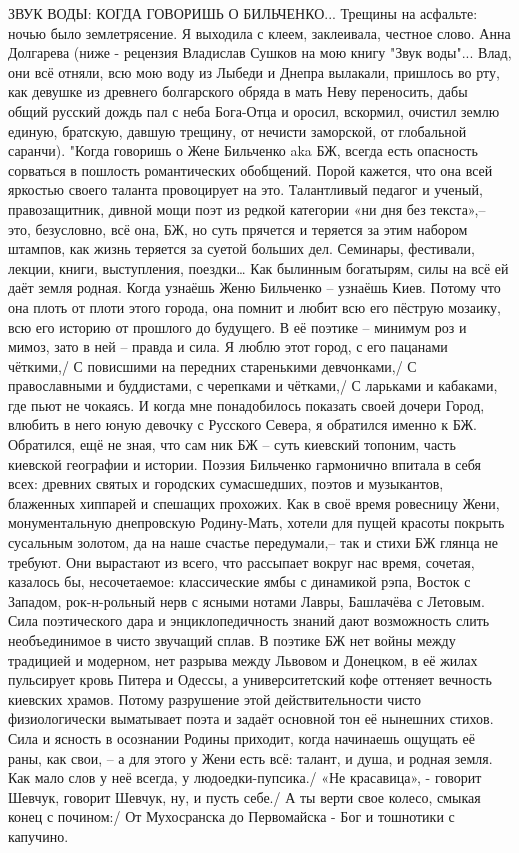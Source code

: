 ЗВУК ВОДЫ: КОГДА ГОВОРИШЬ О БИЛЬЧЕНКО...
Трещины на асфальте: 
ночью было землетрясение.
Я выходила с клеем, 
заклеивала, честное слово.
Анна Долгарева 
(ниже - рецензия Владислав Сушков на мою книгу "Звук воды"... Влад, они всё отняли, всю мою воду из Лыбеди и Днепра вылакали, пришлось во рту, как девушке из древнего болгарского обряда в мать Неву переносить, дабы общий русский дождь пал с неба Бога-Отца и оросил, вскормил, очистил землю единую, братскую, давшую трещину, от нечисти заморской, от глобальной саранчи).
"Когда говоришь о Жене Бильченко aka БЖ, всегда есть опасность сорваться в пошлость романтических обобщений. Порой кажется, что она всей яркостью своего таланта провоцирует на это. Талантливый педагог и ученый, правозащитник, дивной мощи поэт из редкой категории «ни дня без текста»,– это, безусловно, всё она, БЖ, но суть прячется и теряется за этим набором штампов, как жизнь теряется за суетой больших дел. Семинары, фестивали, лекции, книги, выступления, поездки…
Как былинным богатырям, силы на всё ей даёт земля родная. Когда узнаёшь Женю Бильченко – узнаёшь Киев. Потому что она плоть от плоти этого города, она помнит и любит всю его пёструю мозаику, всю его историю от прошлого до будущего. В её поэтике – минимум роз и мимоз, зато в ней – правда и сила. Я люблю этот город, с его пацанами чёткими,/ С повисшими на передних старенькими девчонками,/ С православными и буддистами, с черепками и чётками,/ С ларьками и кабаками, где пьют не чокаясь. И когда мне понадобилось показать своей дочери Город, влюбить в него юную девочку с Русского Севера, я обратился именно к БЖ. Обратился, ещё не зная, что сам ник БЖ – суть киевский топоним, часть киевской географии и истории.
Поэзия Бильченко гармонично впитала в себя всех: древних святых и городских сумасшедших, поэтов и музыкантов, блаженных хиппарей и спешащих прохожих. Как в своё время ровесницу Жени, монументальную днепровскую Родину-Мать, хотели для пущей красоты покрыть сусальным золотом, да на наше счастье передумали,– так и стихи БЖ глянца не требуют. Они вырастают из всего, что рассыпает вокруг нас время, сочетая, казалось бы, несочетаемое: классические ямбы с динамикой рэпа, Восток с Западом, рок-н-рольный нерв с ясными нотами Лавры, Башлачёва с Летовым. Сила поэтического дара и энциклопедичность знаний дают возможность слить необъединимое в чисто звучащий сплав. В поэтике БЖ нет войны между традицией и модерном, нет разрыва между Львовом и Донецком, в её жилах пульсирует кровь Питера и Одессы, а университетский кофе оттеняет вечность киевских храмов. Потому разрушение этой действительности чисто физиологически выматывает поэта и задаёт основной тон её нынешних стихов. Сила и ясность в осознании Родины приходит, когда начинаешь ощущать её раны, как свои, – а для этого у Жени есть всё: талант, и душа, и родная земля. Как мало слов у неё всегда, у людоедки-пупсика./ «Не красавица», - говорит Шевчук, говорит Шевчук, ну, и пусть себе./ А ты верти свое колесо, смыкая конец с почином:/ От Мухосранска до Первомайска - Бог и тошнотики с капучино.
